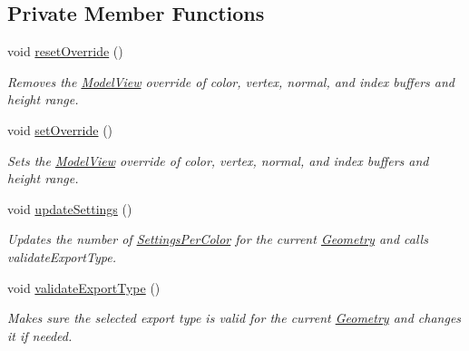 \subsection*{Private Member Functions}
\begin{DoxyCompactItemize}
\item 
\mbox{\label{classpepr3d_1_1_export_assistant_ab2ee00e6bf2de96aee502114a48d3aa2}} 
void \mbox{\hyperlink{classpepr3d_1_1_export_assistant_ab2ee00e6bf2de96aee502114a48d3aa2}{reset\+Override}} ()
\begin{DoxyCompactList}\small\item\em Removes the \mbox{\hyperlink{classpepr3d_1_1_model_view}{Model\+View}} override of color, vertex, normal, and index buffers and height range. \end{DoxyCompactList}\item 
\mbox{\label{classpepr3d_1_1_export_assistant_aa15997d19575439f94ac261a91deacd4}} 
void \mbox{\hyperlink{classpepr3d_1_1_export_assistant_aa15997d19575439f94ac261a91deacd4}{set\+Override}} ()
\begin{DoxyCompactList}\small\item\em Sets the \mbox{\hyperlink{classpepr3d_1_1_model_view}{Model\+View}} override of color, vertex, normal, and index buffers and height range. \end{DoxyCompactList}\item 
\mbox{\label{classpepr3d_1_1_export_assistant_a3f3f04d46d7d147fd6be601ad8290a6e}} 
void \mbox{\hyperlink{classpepr3d_1_1_export_assistant_a3f3f04d46d7d147fd6be601ad8290a6e}{update\+Settings}} ()
\begin{DoxyCompactList}\small\item\em Updates the number of \mbox{\hyperlink{structpepr3d_1_1_export_assistant_1_1_settings_per_color}{Settings\+Per\+Color}} for the current \mbox{\hyperlink{classpepr3d_1_1_geometry}{Geometry}} and calls validate\+Export\+Type. \end{DoxyCompactList}\item 
\mbox{\label{classpepr3d_1_1_export_assistant_aed9235451440d361e5f2281523b3394c}} 
void \mbox{\hyperlink{classpepr3d_1_1_export_assistant_aed9235451440d361e5f2281523b3394c}{validate\+Export\+Type}} ()
\begin{DoxyCompactList}\small\item\em Makes sure the selected export type is valid for the current \mbox{\hyperlink{classpepr3d_1_1_geometry}{Geometry}} and changes it if needed. \end{DoxyCompactList}\item 

\end{DoxyCompactItemize}
